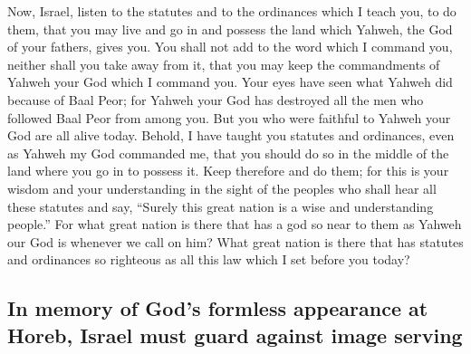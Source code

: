  Now, Israel, listen to the statutes and to the ordinances
which I teach you, to do them, that you may live and go in and possess
the land which Yahweh, the God of your fathers, gives you.
 You shall not add to the word which I command you,
neither shall you take away from it, that you may keep the commandments
of Yahweh your God which I command you.  Your eyes have
seen what Yahweh did because of Baal Peor; for Yahweh your God has
destroyed all the men who followed Baal Peor from among you.
 But you who were faithful to Yahweh your God are all
alive today.  Behold, I have taught you statutes and
ordinances, even as Yahweh my God commanded me, that you should do so in
the middle of the land where you go in to possess it. 
Keep therefore and do them; for this is your wisdom and your
understanding in the sight of the peoples who shall hear all these
statutes and say, ``Surely this great nation is a wise and understanding
people.''  For what great nation is there that has a god
so near to them as Yahweh our God is whenever we call on him?
 What great nation is there that has statutes and
ordinances so righteous as all this law which I set before you today?

\hypertarget{in-memory-of-gods-formless-appearance-at-horeb-israel-must-guard-against-image-serving}{%
\subsection{In memory of God's formless appearance at Horeb, Israel must
guard against image
serving}\label{in-memory-of-gods-formless-appearance-at-horeb-israel-must-guard-against-image-serving}}

